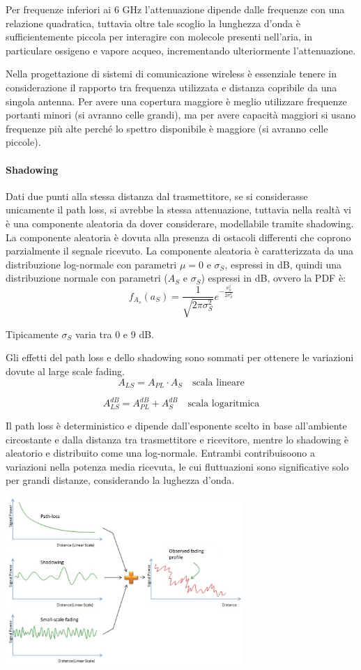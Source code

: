 Per frequenze inferiori ai 6 GHz l'attenuazione dipende dalle frequenze con una relazione quadratica, tuttavia oltre tale scoglio la lunghezza d'onda è sufficientemente piccola per interagire con molecole presenti nell'aria, in particulare ossigeno e vapore acqueo, incrementando ulteriormente l'attenuazione.

Nella progettazione di sistemi di comunicazione wireless è essenziale tenere in considerazione il rapporto tra frequenza utilizzata e distanza copribile da una singola antenna.
Per avere una copertura maggiore è meglio utilizzare frequenze portanti minori (si avranno celle grandi), ma per avere capacità maggiori si usano frequenze più alte perché lo spettro disponibile è maggiore (si avranno celle piccole).
\paragraph*{Shadowing}

Dati due punti alla stessa distanza dal trasmettitore, se si considerasse unicamente il path loss, si avrebbe la stessa attenuazione,
tuttavia nella realtà vi è una componente aleatoria da dover considerare, modellabile tramite shadowing.
La componente aleatoria è dovuta alla presenza di ostacoli differenti che coprono parzialmente il segnale ricevuto.
La componente aleatoria è caratterizzata da una distribuzione log-normale con parametri $\mu = 0$ e $\sigma_S$, espressi in dB, quindi una distribuzione normale con parametri ($A_S$ e $\sigma_S$) espressi in dB,
ovvero la PDF è:
\[
    f_{A_s}(a_S) = \frac{1}{\sqrt{2\pi \sigma_S^2}} e^{-\frac{a_S^2}{2\sigma_S^2}}
\]

Tipicamente $\sigma_S$ varia tra 0 e 9 dB.



Gli effetti del path loss e dello shadowing sono sommati per ottenere le variazioni dovute al large scale fading.
\[
    A_{LS} = A_{PL} \cdot A_S \quad \text{scala lineare}
\]

\[
    A_{LS}^{dB} = A_{PL}^{dB} + A_S^{dB} \quad \text{scala logaritmica}
\]


Il path loss è deterministico e dipende dall'esponente scelto in base all'ambiente circostante e dalla distanza tra trasmettitore e ricevitore,
mentre lo shadowing è aleatorio e distribuito come una log-normale.
Entrambi contribuisoono a variazioni nella potenza media ricevuta, le cui fluttuazioni sono significative solo per grandi distanze, considerando la lughezza d'onda.

\begin{center}
    \includegraphics[width=0.675\textwidth]{imgs/fading_sum.jpg}
\end{center}
